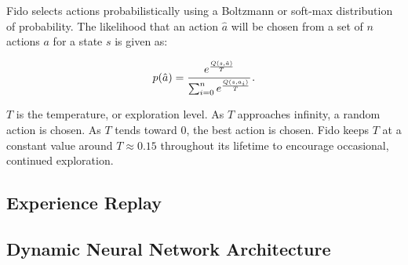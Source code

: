 Fido selects actions probabilistically using a Boltzmann or soft-max distribution of probability.
The likelihood that an action $\hat{a}$ will be chosen from a set of $n$ actions $a$ for a state $s$ is given as:

\begin{equation}
	p(\hat{a}) = \cfrac{e^{\frac{Q(s, \hat{a})}{T}}}{\sum_{i=0}^{n}e^{\frac{Q(s, a_i)}{T}}}
	\,.
	\label{equ::boltzmann}
\end{equation}

$T$ is the temperature, or exploration level.
As $T$ approaches infinity, a random action is chosen.
As $T$ tends toward 0, the best action is chosen.
Fido keeps $T$ at a constant value around $T \approx 0.15$ throughout its lifetime to encourage occasional, continued exploration.

\subsection{Experience Replay}

\subsection{Dynamic Neural Network Architecture}
